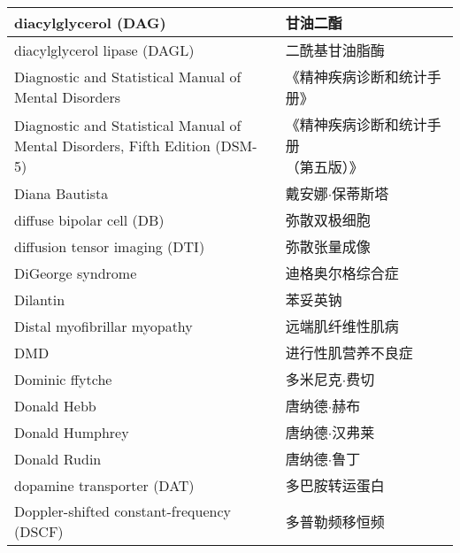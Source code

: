 \begin{longtable}{lll}
	\midrule
	diacylglycerol  (DAG)   &&  甘油二酯  \\
	
	\midrule
	diacylglycerol lipase  (DAGL)   &&  二酰基甘油脂酶  \\
	
	\midrule
	\makecell[l]{Diagnostic and Statistical Manual of \\Mental Disorders}     &&  《精神疾病诊断和统计手册》  \\
	
	\midrule
	\makecell[l]{Diagnostic and Statistical Manual of \\Mental Disorders, Fifth Edition (DSM-5)}     &&  \makecell[l]{《精神疾病诊断和统计手册\\（第五版）》}  \\
	
	\midrule
	Diana Bautista    &&  戴安娜$\cdot$保蒂斯塔  \\
	
	\midrule
	diffuse bipolar cell (DB)    &&  弥散双极细胞  \\
	
	\midrule
	diffusion tensor imaging (DTI)    &&  弥散张量成像  \\
	
	\midrule
	DiGeorge syndrome    &&  迪格奥尔格综合症  \\
	
	\midrule
	Dilantin    &&  苯妥英钠  \\
	
	\midrule
	Distal myofibrillar myopathy    &&  远端肌纤维性肌病  \\
	
	\midrule
	DMD    &&  进行性肌营养不良症  \\
	
	\midrule
	Dominic ffytche    &&  多米尼克$\cdot$费切  \\
	
	\midrule
	Donald Hebb    &&  唐纳德$\cdot$赫布  \\
	
	\midrule
	Donald Humphrey    &&  唐纳德$\cdot$汉弗莱  \\
	
	\midrule
	Donald Rudin    &&  唐纳德$\cdot$鲁丁  \\
	
	\midrule
	dopamine transporter (DAT)     &&  多巴胺转运蛋白  \\
	
	\midrule
	Doppler-shifted constant-frequency (DSCF)     &&  多普勒频移恒频  \\
	

\end{longtable}
